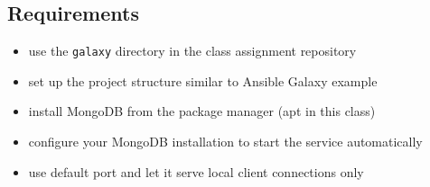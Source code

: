 \subsection{Requirements}\label{requirements}

\begin{itemize}

\item
  use the \texttt{galaxy} directory in the class assignment repository
\item
  set up the project structure similar to Ansible Galaxy example
\item
  install MongoDB from the package manager (apt in this class)
\item
  configure your MongoDB installation to start the service automatically
\item
  use default port and let it serve local client connections only
\end{itemize}

